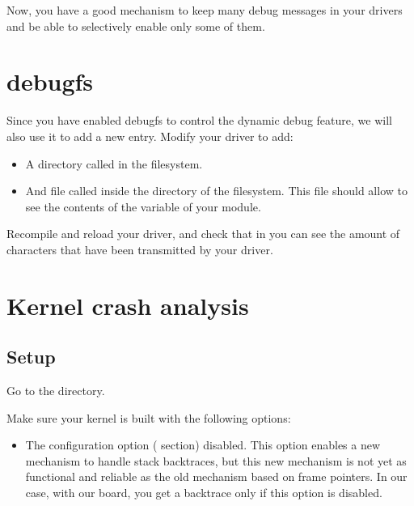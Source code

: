 Now, you have a good mechanism to keep many debug messages in your
drivers and be able to selectively enable only some of them.

\section{debugfs}

Since you have enabled debugfs to control the dynamic debug feature,
we will also use it to add a new  entry. Modify your driver to
add:

\begin{itemize}

\item A directory called  in the  filesystem.

\item And file called  inside the 
  directory of the  filesystem. This file should allow to see
  the contents of the  variable of your module.

\end{itemize}

Recompile and reload your driver, and check that in
 you can see the amount of characters
that have been transmitted by your driver.

\section{Kernel crash analysis}

\subsection{Setup}

Go to the  directory.

Make sure your kernel is built with the following options:

\begin{itemize}

\item The  configuration option
  ( section) disabled. This option enables a
  new mechanism to handle stack backtraces, but this new mechanism is
  not yet as functional and reliable as the old mechanism based on frame
  pointers. In our case, with our board, you get a backtrace only if
  this option is disabled.
\end{itemize}

